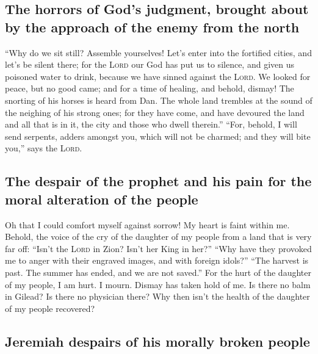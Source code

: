 \hypertarget{the-horrors-of-gods-judgment-brought-about-by-the-approach-of-the-enemy-from-the-north}{%
\subsection{The horrors of God's judgment, brought about by the approach
of the enemy from the
north}\label{the-horrors-of-gods-judgment-brought-about-by-the-approach-of-the-enemy-from-the-north}}

 ``Why do we sit still? Assemble yourselves! Let's enter
into the fortified cities, and let's be silent there; for the
\textsc{Lord} our God has put us to silence, and given us poisoned water
to drink, because we have sinned against the \textsc{Lord}.
 We looked for peace, but no good came; and for a time of
healing, and behold, dismay!  The snorting of his horses
is heard from Dan. The whole land trembles at the sound of the neighing
of his strong ones; for they have come, and have devoured the land and
all that is in it, the city and those who dwell therein.''
 ``For, behold, I will send serpents, adders amongst you,
which will not be charmed; and they will bite you,'' says the
\textsc{Lord}.

\hypertarget{the-despair-of-the-prophet-and-his-pain-for-the-moral-alteration-of-the-people}{%
\subsection{The despair of the prophet and his pain for the moral
alteration of the
people}\label{the-despair-of-the-prophet-and-his-pain-for-the-moral-alteration-of-the-people}}

 Oh that I could comfort myself against sorrow! My heart
is faint within me.  Behold, the voice of the cry of the
daughter of my people from a land that is very far off: ``Isn't the
\textsc{Lord} in Zion? Isn't her King in her?'' ``Why have they provoked
me to anger with their engraved images, and with foreign idols?''
 ``The harvest is past. The summer has ended, and we are
not saved.''  For the hurt of the daughter of my people,
I am hurt. I mourn. Dismay has taken hold of me.  Is
there no balm in Gilead? Is there no physician there? Why then isn't the
health of the daughter of my people recovered?

\hypertarget{jeremiah-despairs-of-his-morally-broken-people}{%
\subsection{Jeremiah despairs of his morally broken
people}\label{jeremiah-despairs-of-his-morally-broken-people}}

